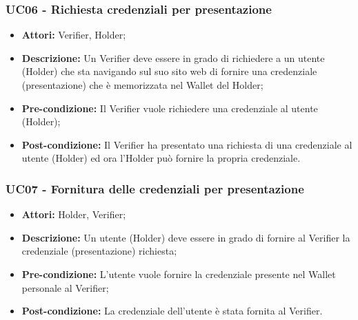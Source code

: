 \subsubsection{UC06 - Richiesta credenziali per presentazione}
\begin{itemize}
\item \textbf{Attori:} Verifier, Holder;
\item \textbf{Descrizione:} Un Verifier deve essere in grado di richiedere a un utente (Holder) che sta navigando sul suo sito web di fornire una credenziale (presentazione) che è memorizzata nel Wallet del Holder;
\item \textbf{Pre-condizione:} Il Verifier vuole richiedere una credenziale al utente (Holder);
\item \textbf{Post-condizione:} Il Verifier ha presentato una richiesta di una credenziale al utente (Holder) ed ora l'Holder può fornire la propria credenziale.
\end{itemize}

\subsubsection{UC07 - Fornitura delle credenziali per presentazione}
\begin{itemize}
\item \textbf{Attori:} Holder, Verifier;
\item \textbf{Descrizione:} Un utente (Holder) deve essere in grado di fornire al Verifier la credenziale (presentazione) richiesta;
\item \textbf{Pre-condizione:} L’utente vuole fornire la credenziale presente nel Wallet personale al Verifier;
\item \textbf{Post-condizione:} La credenziale dell’utente è stata fornita al Verifier.
\end{itemize}

